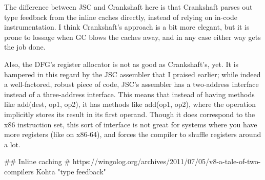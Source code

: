 The difference between JSC and Crankshaft here is that Crankshaft parses out type feedback from the inline caches directly, instead of relying on in-code instrumentation. I think Crankshaft's approach is a bit more elegant, but it is prone to lossage when GC blows the caches away, and in any case either way gets the job done.

Also, the DFG's register allocator is not as good as Crankshaft's, yet. It is hampered in this regard by the JSC assembler that I praised earlier; while indeed a well-factored, robust piece of code, JSC's assembler has a two-address interface instead of a three-address interface. This means that instead of having methods like add(dest, op1, op2), it has methods like add(op1, op2), where the operation implicitly stores its result in its first operand. Though it does correspond to the x86 instruction set, this sort of interface is not great for systems where you have more registers (like on x86-64), and forces the compiler to shuffle registers around a lot.

## Inline caching
# https://wingolog.org/archives/2011/07/05/v8-a-tale-of-two-compilers
Kohta "type feedback"